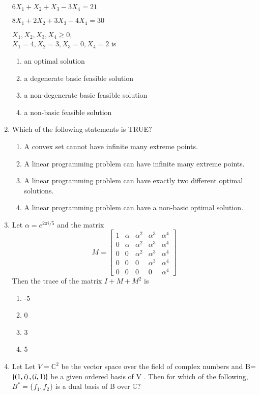 \documentclass[journal]{IEEEtran}
\begin{document}
\begin{enumerate}[start=1]
\hspace{4.1cm} $6X_1+X_2+X_3-3X_4=21$

\hspace{4.1cm} $8X_1+2X_2+3X_3-4X_4=30$

\hspace{4.5cm} $X_1,X_2,X_3,X_4\geq0,$\\
$X_1=4,X_2=3,X_3=0,X_4=2$ is
\begin{enumerate}
    \item an optimal solution
    \item a degenerate basic feasible solution
    \item a non-degenerate basic feasible solution
    \item a non-basic feasible solution
\end{enumerate}
\item Which of the following statements is TRUE$?$
\begin{enumerate}
    \item A convex set cannot have infinite many extreme points.
    \item A linear programming problem can have infinite many extreme points.
    \item A linear programming problem can have exactly two different optimal solutions.
    \item A linear programming problem can have a non-basic optimal solution.
\end{enumerate}
\item Let $\alpha=e^{2\pi i/5}$ and the matrix
  \[
M = \begin{bmatrix}
1 & \alpha & \alpha^2 & \alpha^3 & \alpha^4 \\
0 & \alpha & \alpha^2 & \alpha^3 & \alpha^4 \\
0 & 0 & \alpha^2  & \alpha^3  & \alpha^4 \\
0 & 0 & 0 & \alpha^3 & \alpha^4 \\
0 & 0 & 0 & 0 & \alpha^4
\end{bmatrix}
\]
Then the trace of the matrix $I+M+M^2$ is
\begin{multicols}{4}
    \begin{enumerate}
        \item -5
        \item 0
        \item 3
        \item 5
    \end{enumerate}
\end{multicols}
\item Let Let \( V = \mathbb{C}^2 \) be the vector space over the field of complex numbers and B=$\{\left(1,i\right),\left(i,1\right)\}$ be a given ordered basis of V . Then for which of the following, $B^*=\{f_1,f_2\}$ is a dual basis of B over $\mathbb{C}?$

\end{enumerate}
\end{document}
